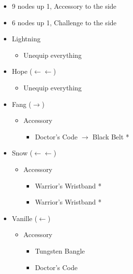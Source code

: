 \begin{menu}
\begin{multicols}{2}
\begin{itemize}
\begin{itemize}
\begin{itemize}
\begin{itemize}
                \item 9 nodes up 1, Accessory to the side
                \item 6 nodes up 1, Challenge to the side
            \end{itemize}
        \end{itemize}
    \end{itemize}
    \columnbreak
    \equip
    \begin{itemize}
        \item Lightning
        \begin{itemize}
            \item Unequip everything
        \end{itemize}
        \item Hope ($\leftarrow\leftarrow$)
        \begin{itemize}
            \item Unequip everything
        \end{itemize}
        \item Fang ($\rightarrow$)
        \begin{itemize}
            \item Accessory
            \begin{itemize}
                \item Doctor's Code $\rightarrow$ Black Belt *
            \end{itemize}
        \end{itemize}
        \item Snow ($\leftarrow\leftarrow$)
        \begin{itemize}
            \item Accessory
            \begin{itemize}
                \item Warrior's Wristband *
                \item Warrior's Wristband *
            \end{itemize}
        \end{itemize}
        \item Vanille ($\leftarrow$)
        \begin{itemize}
            \item Accessory
            \begin{itemize}
                \item Tungsten Bangle
                \item Doctor's Code
            \end{itemize}

\end{itemize}
\end{itemize}
\end{itemize}
\end{multicols}
\end{menu}
